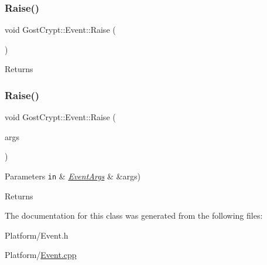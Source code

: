 \subsubsection{\texorpdfstring{Raise()}{Raise()}\hspace{0.1cm}{\footnotesize\ttfamily [1/2]}}
{\footnotesize\ttfamily void Gost\+Crypt\+::\+Event\+::\+Raise (\begin{DoxyParamCaption}{ }\end{DoxyParamCaption})}

\begin{DoxyReturn}{Returns}

\end{DoxyReturn}
\mbox{\label{class_gost_crypt_1_1_event_a142ec026100ee558e74241fb8c3b3b7f}} 
\subsubsection{\texorpdfstring{Raise()}{Raise()}\hspace{0.1cm}{\footnotesize\ttfamily [2/2]}}
{\footnotesize\ttfamily void Gost\+Crypt\+::\+Event\+::\+Raise (\begin{DoxyParamCaption}\item[{\hyperlink{struct_gost_crypt_1_1_event_args}{Event\+Args} \&}]{args }\end{DoxyParamCaption})}


\begin{DoxyParams}[1]{Parameters}
\mbox{\tt in}  & {\em \hyperlink{struct_gost_crypt_1_1_event_args}{Event\+Args}} & \&args) \\
\hline
\end{DoxyParams}
\begin{DoxyReturn}{Returns}

\end{DoxyReturn}


The documentation for this class was generated from the following files\+:\begin{DoxyCompactItemize}
\item 
Platform/Event.\+h\item 
Platform/\hyperlink{_event_8cpp}{Event.\+cpp}\end{DoxyCompactItemize}
